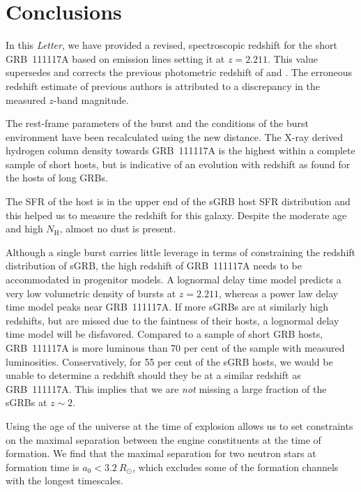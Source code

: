 \documentclass{aa}    %
\begin{document}
\section{Conclusions}

In this \emph{Letter}, we have provided a revised, spectroscopic redshift for the short
GRB~111117A based on emission lines %
setting it at $z = 2.211$. This value supersedes and corrects the previous
photometric redshift of \citet{Margutti2012} and \citet{Sakamoto2013}. The erroneous redshift estimate of previous authors is attributed to a discrepancy in the measured $z$-band magnitude.

The rest-frame parameters of the burst and the conditions of the burst
environment have been recalculated using the new distance. The X-ray derived
hydrogen column density towards GRB~111117A is the highest within a complete
sample of short hosts, but is indicative of an evolution with redshift as found
for the hosts of long GRBs.

The SFR of the host is in the upper end of the sGRB host SFR distribution and
this helped us to measure the redshift for this galaxy. Despite
the moderate age and high $N_\mathrm{H}$, almost no dust is present.

Although a single burst carries little leverage in terms of constraining the
redshift distribution of sGRB, the high redshift of GRB~111117A needs to be
accommodated in progenitor models. A lognormal delay time model predicts a very low volumetric
density of bursts at $z = 2.211$, whereas a power law delay time model peaks
near GRB~111117A. If more sGRBs are at similarly high redshifts, but are missed due to
the faintness of their hosts, a lognormal delay time model will be disfavored.
Compared to a sample of short GRB hosts, GRB~111117A is more luminous than 70 per
cent of the sample with measured luminosities. Conservatively, for 55 per
cent of the sGRB hosts, we would be unable to determine a redshift should they be at 
a similar redshift as GRB~111117A. This implies that we are \textit{not} missing a large
fraction of the sGRBs at $z \sim 2$.

Using the age of the universe at the time of explosion allows us to set
constraints on the maximal separation between the engine constituents at the
time of formation. We find that the maximal separation for two neutron stars at
formation time is $a_0 < 3.2~R_\odot$, which excludes some of the formation
channels with the longest timescales.
\end{document}
